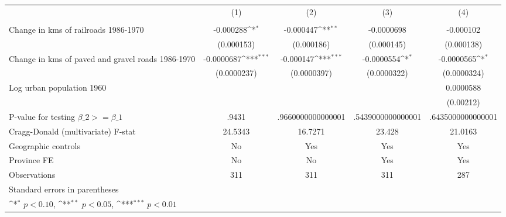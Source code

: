 {
\def\sym#1{\ifmmode^{#1}\else\(^{#1}\)\fi}
\begin{tabular}{l*{4}{c}}
\hline\hline
                &\multicolumn{1}{c}{(1)}&\multicolumn{1}{c}{(2)}&\multicolumn{1}{c}{(3)}&\multicolumn{1}{c}{(4)}\\
                &\multicolumn{1}{c}{}&\multicolumn{1}{c}{}&\multicolumn{1}{c}{}&\multicolumn{1}{c}{}\\
\hline
Change in kms of railroads 1986-1970&-0.000288\sym{*}  &-0.000447\sym{**} &-0.0000698         &-0.000102         \\
                &(0.000153)         &(0.000186)         &(0.000145)         &(0.000138)         \\
[1em]
Change in kms of paved and gravel roads 1986-1970&-0.0000687\sym{***}&-0.000147\sym{***}&-0.0000554\sym{*}  &-0.0000565\sym{*}  \\
                &(0.0000237)         &(0.0000397)         &(0.0000322)         &(0.0000324)         \\
[1em]
Log urban population 1960&                  &                  &                  &0.0000588         \\
                &                  &                  &                  &(0.00212)         \\
\hline
P-value for testing $\beta\_{2} >= \beta\_{1}$&    .9431         &.9660000000000001         &.5439000000000001         &.6435000000000001         \\
Cragg-Donald (multivariate) F-stat&  24.5343         &  16.7271         &   23.428         &  21.0163         \\
Geographic controls&       No         &      Yes         &      Yes         &      Yes         \\
Province FE     &       No         &       No         &      Yes         &      Yes         \\
Observations    &      311         &      311         &      311         &      287         \\
\hline\hline
\multicolumn{5}{l}{\footnotesize Standard errors in parentheses}\\
\multicolumn{5}{l}{\footnotesize \sym{*} \(p<0.10\), \sym{**} \(p<0.05\), \sym{***} \(p<0.01\)}\\
\end{tabular}
}
